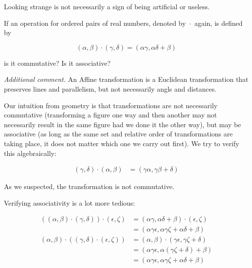 Looking strange is not necessarily a sign of being artificial or useless.

\begin{problem}
If an operation for ordered pairs of real numbers, denoted by $\boxed{\cdot}$ again, is defined by

\begin{equation}
    (\alpha, \beta) \boxed{\cdot} (\gamma, \delta) = (\alpha\gamma, \alpha\delta + \beta)
\end{equation}

is it commutative? Is it associative?
\end{problem}

\textit{Additional comment.} An Affine transformation is a Euclidean transformation that preserves lines and parallelism, but not necessarily angls and distances.

Our intuition from geometry is that transformations are not necessarily commutative (transforming a figure one way and then another may not necessarily result in the same figure had we done it the other way), but may be associative (as long as the same set and relative order of transformations are taking place, it does not matter which one we carry out first). We try to verify this algebraically:

\begin{align}
    (\gamma, \delta) \boxed{\cdot} (\alpha, \beta) & = (\gamma\alpha, \gamma\beta + \delta)
\end{align}

As we suspected, the transformation is not commutative.

Verifying associativity is a lot more tedious:

\begin{align}
    ((\alpha, \beta) \boxed{\cdot} (\gamma, \delta)) \boxed{\cdot} (\epsilon, \zeta)
     & = (\alpha\gamma, \alpha\delta + \beta) \boxed{\cdot} (\epsilon, \zeta) \\
     & = (\alpha\gamma\epsilon, \alpha\gamma\zeta + \alpha\delta + \beta)     \\
    (\alpha,\beta) \boxed{\cdot} ((\gamma,\delta) \boxed{\cdot} (\epsilon, \zeta))
     & = (\alpha, \beta) \boxed{\cdot} (\gamma\epsilon, \gamma\zeta + \delta) \\
     & = (\alpha\gamma\epsilon, \alpha(\gamma\zeta + \delta) + \beta)         \\
     & = (\alpha\gamma\epsilon, \alpha\gamma\zeta + \alpha\delta + \beta)
\end{align}

